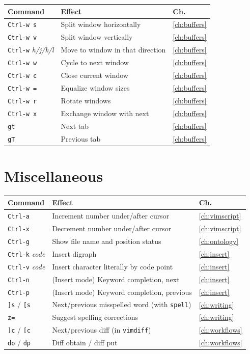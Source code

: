 \begin{longtable}{@{}l p{9cm} l@{}}
\textbf{Command} & \textbf{Effect} & \textbf{Ch.} \\
\hline
\endhead
\texttt{Ctrl-w s} & Split window horizontally & \ref{ch:buffers} \\
\texttt{Ctrl-w v} & Split window vertically & \ref{ch:buffers} \\
\texttt{Ctrl-w} \textit{h/j/k/l} & Move to window in that direction & \ref{ch:buffers} \\
\texttt{Ctrl-w w} & Cycle to next window & \ref{ch:buffers} \\
\texttt{Ctrl-w c} & Close current window & \ref{ch:buffers} \\
\texttt{Ctrl-w =} & Equalize window sizes & \ref{ch:buffers} \\
\texttt{Ctrl-w r} & Rotate windows & \ref{ch:buffers} \\
\texttt{Ctrl-w x} & Exchange window with next & \ref{ch:buffers} \\
\texttt{gt} & Next tab & \ref{ch:buffers} \\
\texttt{gT} & Previous tab & \ref{ch:buffers} \\
\end{longtable}

\section{Miscellaneous}

\begin{longtable}{@{}l p{9cm} l@{}}
\textbf{Command} & \textbf{Effect} & \textbf{Ch.} \\
\hline
\endhead
\texttt{Ctrl-a} & Increment number under/after cursor & \ref{ch:vimscript} \\
\texttt{Ctrl-x} & Decrement number under/after cursor & \ref{ch:vimscript} \\
\texttt{Ctrl-g} & Show file name and position status & \ref{ch:ontology} \\
\texttt{Ctrl-k} \textit{code} & Insert digraph & \ref{ch:insert} \\
\texttt{Ctrl-v} \textit{code} & Insert character literally by code point & \ref{ch:insert} \\
\texttt{Ctrl-n} & (Insert mode) Keyword completion, next & \ref{ch:insert} \\
\texttt{Ctrl-p} & (Insert mode) Keyword completion, previous & \ref{ch:insert} \\
\texttt{]s} / \texttt{[s} & Next/previous misspelled word (with \texttt{spell}) & \ref{ch:writing} \\
\texttt{z=} & Suggest spelling corrections & \ref{ch:writing} \\
\texttt{]c} / \texttt{[c} & Next/previous diff (in \texttt{vimdiff}) & \ref{ch:workflows} \\
\texttt{do} / \texttt{dp} & Diff obtain / diff put & \ref{ch:workflows} \\
\end{longtable}
